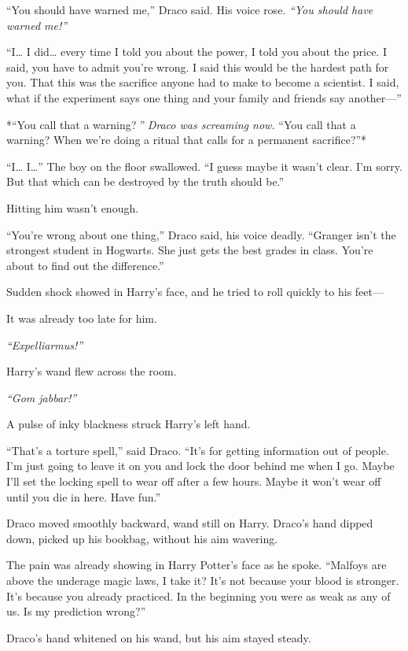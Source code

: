 ``You should have warned me,'' Draco said. His voice rose. \emph{``You
should have warned me!''}

``I\ldots{} I did\ldots{} every time I told you about the power, I told
you about the price. I said, you have to admit you're wrong. I said this
would be the hardest path for you. That this was the sacrifice anyone
had to make to become a scientist. I said, what if the experiment says
one thing and your family and friends say another---''

*``You call that a warning?\emph{ '' Draco was screaming now. }``You
call that a warning? When we're doing a ritual that calls for a
permanent sacrifice?''*

``I\ldots{} I\ldots{}'' The boy on the floor swallowed. ``I guess maybe
it wasn't clear. I'm sorry. But that which can be destroyed by the truth
should be.''

Hitting him wasn't enough.

``You're wrong about one thing,'' Draco said, his voice deadly.
``Granger isn't the strongest student in Hogwarts. She just gets the
best grades in class. You're about to find out the difference.''

Sudden shock showed in Harry's face, and he tried to roll quickly to his
feet---

It was already too late for him.

\emph{``Expelliarmus!''}

Harry's wand flew across the room.

\emph{``Gom jabbar!''}

A pulse of inky blackness struck Harry's left hand.

``That's a torture spell,'' said Draco. ``It's for getting information
out of people. I'm just going to leave it on you and lock the door
behind me when I go. Maybe I'll set the locking spell to wear off after
a few hours. Maybe it won't wear off until you die in here. Have fun.''

Draco moved smoothly backward, wand still on Harry. Draco's hand dipped
down, picked up his bookbag, without his aim wavering.

The pain was already showing in Harry Potter's face as he spoke.
``Malfoys are above the underage magic laws, I take it? It's not because
your blood is stronger. It's because you already practiced. In the
beginning you were as weak as any of us. Is my prediction wrong?''

Draco's hand whitened on his wand, but his aim stayed steady.

